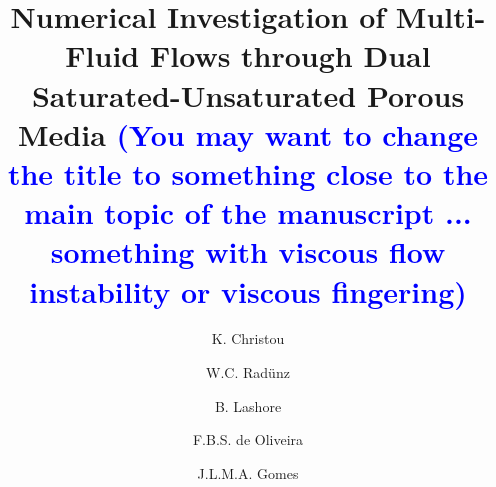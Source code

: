\documentclass[preprint,authoryear,12pt]{elsarticle}
\newcommand{\blue}{\textcolor{blue}}
\begin{document}
\begin{frontmatter}



\title{Numerical Investigation of Multi-Fluid Flows through Dual Saturated-Unsaturated Porous Media \blue{(You may want to change the title to something close to the main topic of the manuscript ... something with viscous flow instability or viscous fingering)}}

\author[UoA]{K. Christou} \author[UoA,UFRGS]{W.C. Rad\"unz}  \author[UoA]{B. Lashore} \author[UESC]{F.B.S. de Oliveira}
\author[UoA]{J.L.M.A. Gomes}

\address[UoA]{Environmental and Industrial Fluid Mechanics Group, School of Engineering, University of Aberdeen, UK}
\address[UFRGS]{Engineering School, Federal University of Rio Grande do Sul, Brazil}
\address[UESC]{Department of Exact and Technological Sciences, State University of Santa Cruz, Bahia, Brazil}


\end{frontmatter}
\end{document}

